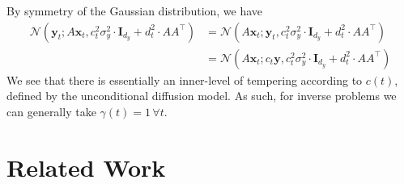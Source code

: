 \begin{remark}
    By symmetry of the Gaussian distribution, we have
    \begin{align*}
        \mathcal{N}(\mathbf{y}_t; A\mathbf{x}_t, c_t^2\sigma_y^2\cdot \mathbf{I}_{d_y} + d_t^2\cdot AA^\top) &= \mathcal{N}(A\mathbf{x}_t; \mathbf{y}_t, c_t^2\sigma_y^2\cdot \mathbf{I}_{d_y} + d_t^2\cdot AA^\top) \\
        &= \mathcal{N}(A\mathbf{x}_t; c_t\mathbf{y}, c_t^2\sigma_y^2\cdot \mathbf{I}_{d_y} + d_t^2\cdot AA^\top)
    \end{align*}
    We see that there is essentially an inner-level of tempering according to $c(t)$, defined by the
    unconditional diffusion model. As such, for inverse problems we can generally take
    $\gamma(t) = 1\, \forall t$.
\end{remark}

\section{Related Work} \label{sec:relation-to-related}

